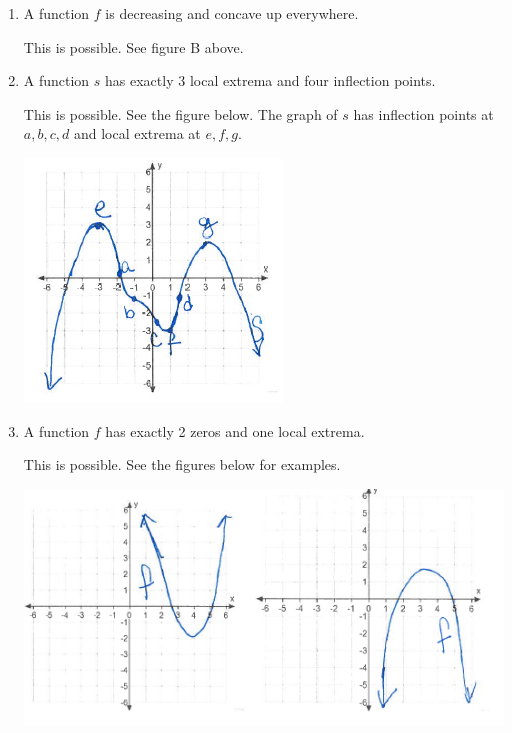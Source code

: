 \documentclass[nooutcomes,handout]{ximera}
\begin{document}
\begin{problem}
\begin{enumerate}
\begin{freeResponse}
	\end{freeResponse}
	\item A function $f$ is decreasing and concave up everywhere.
	\begin{freeResponse}
	This is possible.  See figure B above.
	\end{freeResponse}	
	\item A function $s$ has exactly 3 local extrema and four inflection points.
		\begin{freeResponse}
	This is possible.  See the figure below.  The graph of $s$ has inflection points at $a,b,c,d$ and local extrema at $e,f,g$.
		      \begin{image}
        \includegraphics[scale = 0.5]{figure9.png}
      \end{image}	
	\end{freeResponse}	
	\item A function $f$ has exactly 2 zeros and one local extrema.
  	  		\begin{freeResponse}
	This is possible.  See the figures below for examples.
		      \begin{image}
        \includegraphics[scale = 0.5]{figure10.png}
      \end{image}	
      	\end{freeResponse}	

\end{enumerate}



\end{problem}
\end{document}
